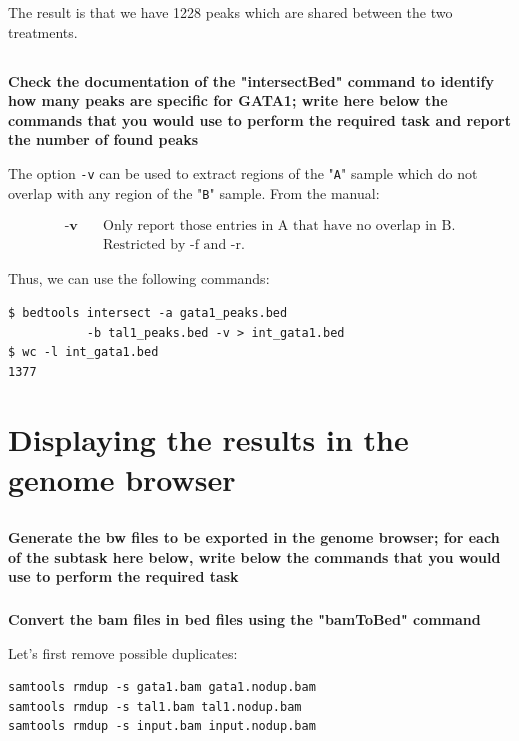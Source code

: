 \documentclass[12pt, a4paper]{article}
\begin{document}
The result is that we have 1228 peaks which are shared between the two treatments.

\subsection{}
\textbf{Check the documentation of the "intersectBed" command to identify how many peaks are specific for GATA1; write here below the commands that you would use to perform the required task and report the number of found peaks}

The option \verb|-v| can be used to extract regions of the "\verb|A|" sample which do not overlap with any region of the "\verb|B|" sample. From the manual:
\begin{displayquote}
	\begin{align*}
		\textbf{-v} \quad & \text{Only report those entries in A that have no overlap in B.}\\
			                       & \text{Restricted by -f and -r.}
	\end{align*}
\end{displayquote}

Thus, we can use the following commands:

\begin{verbatim}
$ bedtools intersect -a gata1_peaks.bed
           -b tal1_peaks.bed -v > int_gata1.bed
$ wc -l int_gata1.bed
1377
\end{verbatim}

\section{Displaying the results in the genome browser}

\subsection{}
\textbf{Generate the bw files to be exported in the genome browser; for each of the subtask here below, write below the commands that you would use to perform the required task}

\subsubsection{}
\textbf{Convert the bam files in bed files using the "bamToBed" command}

Let's first remove possible duplicates:

\begin{verbatim}
samtools rmdup -s gata1.bam gata1.nodup.bam
samtools rmdup -s tal1.bam tal1.nodup.bam
samtools rmdup -s input.bam input.nodup.bam
\end{verbatim}
\end{document}
